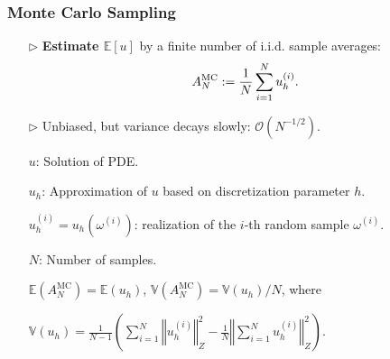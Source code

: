 \documentclass{beamer}
\begin{document}
\begin{frame}[t]
    \frametitle{Monte Carlo Sampling}
    \begin{itemize}[leftmargin=5pt] 
        \item[$\triangleright$] {\fontsize{10}{10}\selectfont \textcolor{myblue3}{\bf Estimate $\mathbb{E}[u]$} by  a finite number of i.i.d. sample averages:
            \[
		A^{\text{MC}}_N:= \frac {1}{N}\sum_{i=1}^N u_h^{(i)}.
		\vspace{-2mm}
		\]
                }
        \item[$\triangleright$] Unbiased, but variance decays slowly: $\mathcal{O}(N^{-1/2})$. 
			{\fontsize{10}{10}\selectfont 
				
				\vspace{2mm}
				$u$: Solution of PDE. 
				
				$u_{h}$: Approximation of $u$ based on discretization parameter $h$. 
				
				$u_h^{(i)} = u_h(\omega^{(i)})$: realization of the $i$-th random sample $\omega^{(i)}$. 	 
				
				$N$: Number of samples. }
				\vspace{-3mm}
				{\fontsize{9}{10}\selectfont
			}
  {\fontsize{10}{10}\selectfont 
  $\mathbb{E}(A^{\text{MC}}_N) = \mathbb{E}(u_h)$, $\mathbb{V}(A^{\text{MC}}_N)= \mathbb{V}(u_h)/N$, where}
  {\fontsize{9}{10}\selectfont
  	
$
\mathbb{V}(u_h) = \frac{1}{N-1}\left(\sum_{i=1}^{N}\left\Vert u_h^{(i)}\right\Vert_{Z}^2-\frac{1}{N}\left\Vert\sum_{i=1}^{N}u_h^{(i)}\right\Vert_{Z}^2\right).
$
}
\end{itemize}
\end{frame}
\end{document}
